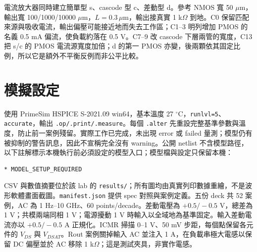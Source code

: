 電流放大器同時建立簡單型 s、cascode 型 c、差動型 d。參考 NMOS 寬 50 $\mu$m，輸出寬 100/1000/10000 $\mu$m，$L=0.3\,\mu$m，輸出接真實 1 k$\Omega$ 到地。C0 保留匹配來源與吸收電流，輸出偏壓可能接近地而失去工作區；C1--3 明列增加 PMOS 的名義 0.5 mA 偏流，使負載約落在 0.5 V。C7--9 改 cascode 下層兩管的寬度，C13 把 s/c 的 PMOS 電流源寬度加倍；d 的第一 PMOS 亦變，後兩顆依其固定比例，所以它是額外不平衡反例而非公平比較。

\section{模擬設定}
使用 PrimeSim HSPICE S-2021.09 win64，基本溫度 27 $^\circ$C，\texttt{runlvl=5}、\texttt{accurate}，輸出 \texttt{.op/.print/.measure}。每個 \texttt{.alter} 先重設完整基準參數與溫度，防止前一案例殘留。實際工作已完成，未出現 error 或 failed 量測；模型仍有被抑制的警告訊息，因此不宣稱完全沒有 warning。公開 netlist 不含模型路徑，以下註解標示本機執行前必須設定的模型入口；模型檔與設定只保留本機：
\begin{verbatim}
* MODEL_SETUP_REQUIRED
\end{verbatim}
CSV 與數值摘要位於該 lab 的 \texttt{results/}；所有圖均由真實列印數據重繪，不是波形軟體畫面截圖。\texttt{manifest.json} 提供 spec 對照與案例定義。五份 deck 共 52 案例，AC 為 1 Hz--10 GHz、60 points/decade。差動電壓為 $+0.5/-0.5$ V，總差為 1 V；共模兩端同相 1 V；電源擾動 1 V 時輸入以全域地為基準固定。輸入差動電流亦以 $+0.5/-0.5$ A 正規化。ICMR 掃描 0--1 V、50 mV 步距，每個點保留各元件的 $V_{DS}$ 與 $V_{DSAT}$。Rout 案例關掉輸入 AC 並注入 1 A，在負載串極大電感以保留 DC 偏壓並於 AC 移除 1 k$\Omega$；這是測試夾具，非實作電感。

